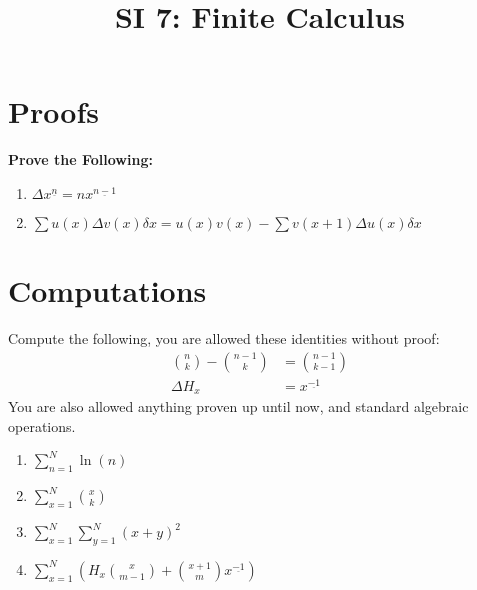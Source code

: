 \documentclass[12pt]{article}
\date{}
\author{}
\title{SI 7: Finite Calculus}
\begin{document}
	\maketitle
	\section{Proofs}
	\textbf{Prove the Following:}
	\begin{enumerate}
		\item $\Delta x^{\underline{n}} = nx^{\underline{n-1}}$
		\item $\sum u(x)\Delta v(x) \delta x = u(x)v(x) - \sum v(x+1)\Delta u(x)\delta x$
	\end{enumerate}
	\section{Computations}
	Compute the following, you are allowed these identities without proof:
	\begin{align}
		{n\choose k} - {{n-1}\choose k} &= {{n-1} \choose {k-1}}\\[.1in]
		\Delta H_x &= x^{\underline{-1}}
	\end{align}
	You are also allowed anything proven up until now, and standard algebraic operations.
	
	\begin{enumerate}[resume]
		\item $\sum^N_{n=1} \ln (n)$
		\item $\sum^{N}_{x=1} {x\choose k}$
		\item $\sum^N_{x=1}\sum^N_{y=1}(x+y)^2$
		\item $\sum^N_{x=1}(H_x {x\choose{m-1}}+{{x+1}\choose m}x^{\underline{-1}})$
	\end{enumerate}
\end{document}

